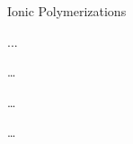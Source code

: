 \begin{activity}{Ionic Polymerizations}
\begin{instructornotes}
\end{instructornotes}


\begin{model}
	\label{\labelbase:mdl:anionic}


	
\end{model}


\begin{ctqs}

	\question ...

\end{ctqs}

\begin{infobox}

	\dots
	
\end{infobox}

\begin{ctqs}
	
	\question \dots
		
\end{ctqs}


\begin{exercises}

	\exercise \dots
	
\end{exercises}


%
%	


	
\end{activity}